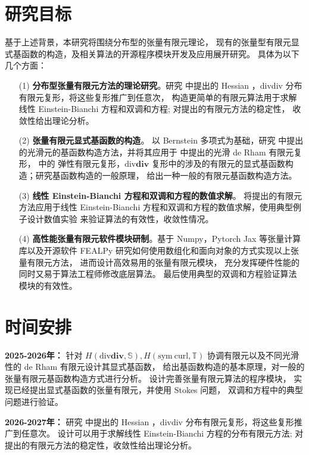 \documentclass[lang=cn,a4paper,newtx]{elegantpaper}
\begin{document}
\section{研究目标}
基于上述背景，本研究将围绕分布型的张量有限元理论，
现有的张量型有限元显式基函数的构造，及相关算法的开源程序模块开发及应用展开研究。
具体为以下几个方面：
\begin{enumerate}
    \item[(1)]
        \textbf{分布型张量有限元方法的理论研究}。研究\cite{hu2023distributional} 
        中提出的 Hessian ，divdiv 分布有限元复形，将这些复形推广到任意次，
        构造更简单的有限元算法用于求解线性
        Einstein-Bianchi 方程和双调和方程; 对提出的有限元方法的稳定性，
        收敛性给出理论分析。
    \item[(2)] \textbf{张量有限元显式基函数的构造}。
        以 Bernstein 多项式为基础，研究 \cite{hu2023construction}
        中提出的光滑元的基函数构造方法，并将其应用于
        \cite{chenhuangstokes2024} 中提出的光滑 de Rham 有限元复形，
        \cite{chenhuang2022finitemc, huliangma2022conforming} 中的
        弹性有限元复形，$\mathrm{div}\mathbf{div}$
        复形中的涉及的有限元的显式基函数构造；研究基函数构造的一般原理，
        给出一种一般的有限元基函数构造方法。
    \item[(3)] \textbf{线性 Einstein-Bianchi 方程和双调和方程的数值求解}。
        将提出的有限元方法应用于线性 Einstein-Bianchi
        方程和双调和方程的数值求解，使用典型例子设计数值实验
        来验证算法的有效性，收敛性情况。
    \item[(4)] \textbf{高性能张量有限元软件模块研制}。基于 Numpy，Pytorch 
        Jax 等张量计算库以及开源软件 FEALPy 
        研究如何使用数组化和面向对象的方式实现以上张量有限元方法，
        进而设计高效易用的张量有限元模块，
        充分发挥硬件性能的同时又易于算法工程师修改底层算法。
        最后使用典型的双调和方程验证算法模块的有效性。
\end{enumerate}

\section{时间安排}
\textbf{2025-2026年：} 针对 $H(\mathrm{div}\mathbf{div}, \mathbb{S}), H(\mathrm{sym\ curl},
\mathbb{T})$
协调有限元以及不同光滑性的 de Rham 有限元设计其显式基函数，
给出基函数构造的基本原理，对一般的张量有限元基函数构造方式进行分析。
设计完善张量有限元算法的程序模块，
实现已经提出显式基函数的张量有限元，并使用 Stokes 问题，
双调和方程中的典型问题进行验证。

\textbf{2026-2027年：} 研究\cite{hu2023distributional} 
中提出的 Hessian ，divdiv 分布有限元复形，将这些复形推广到任意次。
设计可以用于求解线性 Einstein-Bianchi 方程的分布有限元方法; 
对提出的有限元方法的稳定性，收敛性给出理论分析。
\end{document}
